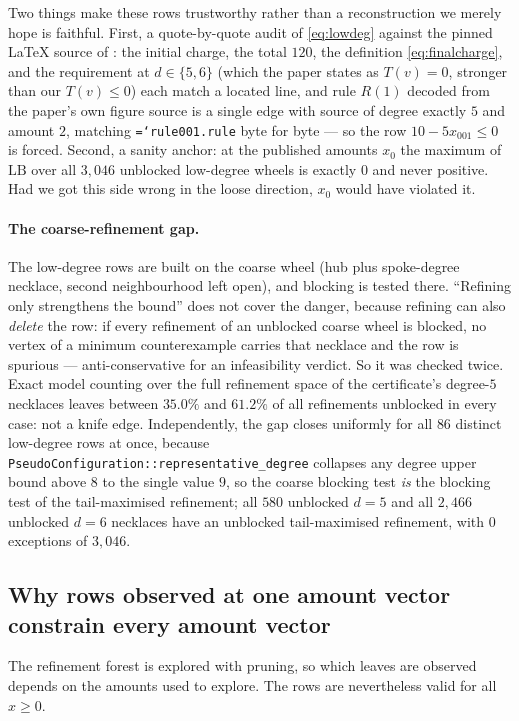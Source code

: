 \documentclass[11pt]{article}
\theoremstyle{definition}
\newcommand{\art}[1]{{\texttt{\hyphenchar\font=`\-\relax #1}}}
\newcommand{\LB}{\mathrm{LB}}
\begin{document}
Two things make these rows trustworthy rather than a reconstruction we merely
hope is faithful. First, a quote-by-quote audit of \eqref{eq:lowdeg} against the
pinned \LaTeX{} source of \cite{nl4ct2026}: the initial charge, the total $120$,
the definition \eqref{eq:finalcharge}, and the requirement at $d\in\{5,6\}$
(which the paper states as $T(v)=0$, stronger than our $T(v)\le0$) each match a
located line, and rule $R(1)$ decoded from the paper's own figure source is a
single edge with source of degree exactly $5$ and amount $2$, matching
\art{rule001.rule} byte for byte --- so the row $10 - 5x_{001} \le 0$ is forced.
Second, a sanity anchor: at the published amounts $x_0$ the maximum of $\LB$ over
all $3{,}046$ unblocked low-degree wheels is exactly $0$ and never positive. Had
we got this side wrong in the loose direction, $x_0$ would have violated it.

\paragraph{The coarse-refinement gap.} The low-degree rows are built on the
coarse wheel (hub plus spoke-degree necklace, second neighbourhood left open),
and blocking is tested there. ``Refining only strengthens the bound'' does not
cover the danger, because refining can also \emph{delete} the row: if every
refinement of an unblocked coarse wheel is blocked, no vertex of a minimum
counterexample carries that necklace and the row is spurious ---
anti-conservative for an infeasibility verdict. So it was checked twice. Exact
model counting over the full refinement space of the certificate's degree-$5$
necklaces leaves between $35.0\%$ and $61.2\%$ of all refinements unblocked in
every case: not a knife edge. Independently, the gap closes uniformly for all
$86$ distinct low-degree rows at once, because
\texttt{PseudoConfiguration::representative\_degree} collapses any degree upper
bound above $8$ to the single value $9$, so the coarse blocking test \emph{is}
the blocking test of the tail-maximised refinement; all $580$ unblocked $d=5$ and
all $2{,}466$ unblocked $d=6$ necklaces have an unblocked tail-maximised
refinement, with $0$ exceptions of $3{,}046$.

\subsection{Why rows observed at one amount vector constrain every amount vector}

The refinement forest is explored with pruning, so which leaves are observed
depends on the amounts used to explore. The rows are nevertheless valid for all
$x \ge 0$.
\end{document}
